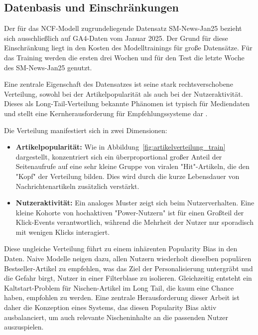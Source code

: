 \subsection{Datenbasis und Einschränkungen}
\label{sec:data}
Der für das \ac{NCF}-Modell zugrundeliegende Datensatz SM-News-Jan25 bezieht sich ausschließlich auf \ac{GA4}-Daten vom Januar 2025.
Der Grund für diese Einschränkung liegt in den Kosten des Modelltrainings für große Datensätze. Für das Training werden die ersten drei Wochen 
und für den Test die letzte Woche des SM-News-Jan25 genutzt. 

Eine zentrale Eigenschaft des Datensatzes ist seine stark rechtsverschobene Verteilung, 
sowohl bei der Artikelpopularität als auch bei der Nutzeraktivität. Dieses als Long-Tail-Verteilung 
bekannte Phänomen ist typisch für Mediendaten und stellt eine Kernherausforderung für Empfehlungssysteme dar \cite{wu_personalized_2022, raza_news_2020}.



\newpage
Die Verteilung manifestiert sich in zwei Dimensionen:

\begin{itemize}
    \item 
    \textbf{Artikelpopularität:} Wie in Abbildung~\ref{fig:artikelverteilung_train} dargestellt,\newline 
    konzentriert sich ein 
    überproportional großer Anteil der Seitenaufrufe auf eine sehr kleine Gruppe von viralen "Hit"-Artikeln, die den "Kopf" der Verteilung bilden. 
    Dies wird durch die kurze Lebensdauer von Nachrichtenartikeln zusätzlich verstärkt.
    \item \textbf{Nutzeraktivität:} Ein analoges Muster zeigt sich beim Nutzerverhalten. 
    Eine kleine Kohorte von hochaktiven "Power-Nutzern" ist für einen Großteil der Klick-Events verantwortlich, während die Mehrheit der Nutzer nur 
    sporadisch mit wenigen Klicks interagiert.
\end{itemize}

Diese ungleiche Verteilung führt zu einem inhärenten Popularity Bias in den Daten. 
Naive Modelle neigen dazu, allen Nutzern wiederholt dieselben populären Bestseller-Artikel zu empfehlen, 
was das Ziel der Personalisierung untergräbt und die Gefahr birgt, Nutzer in einer Filterblase zu isolieren. 
Gleichzeitig entsteht ein Kaltstart-Problem für Nischen-Artikel im Long Tail, die kaum eine Chance haben, empfohlen zu werden. 
Eine zentrale Herausforderung dieser Arbeit ist daher die Konzeption eines Systems, 
das diesen Popularity Bias aktiv ausbalanciert, um auch relevante Nischeninhalte an die passenden Nutzer auszuspielen.

